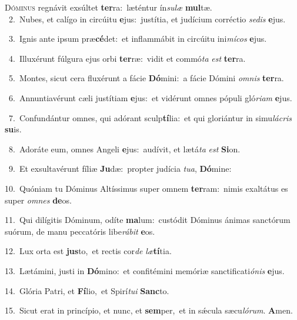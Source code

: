 \lettrine{\initial\textcolor{\initialcolor}{D}}{óminus} regnávit exsúltet \textbf{ter}\-ra:~\star læténtur ín\-\textit{su}\-\textit{læ} \textbf{mul}\-tæ.\\
{\numbfont\textcolor{\numbcolor}{~2.}}~Nubes, et calígo in circúitu \textbf{e}\-jus:~\star justítia, et judícium corréctio \textit{se}\-\textit{dis} \textbf{e}\-jus.\par
{\numbfont\textcolor{\numbcolor}{~3.}}~Ignis ante ipsum præ\-\textbf{cé}\-det:~\star et inflammábit in circúitu ini\-\textit{mí}\-\textit{cos} \textbf{e}\-jus.\par
{\numbfont\textcolor{\numbcolor}{~4.}}~Illuxérunt fúlgura ejus orbi \textbf{ter}\-ræ:~\star vidit et commó\textit{ta} \textit{est} \textbf{ter}\-ra.\par
{\numbfont\textcolor{\numbcolor}{~5.}}~Montes, sicut cera fluxérunt a fácie \textbf{Dó}\-mini:~\star a fácie Dómini \textit{om}\-\textit{nis} \textbf{ter}\-ra.\par
{\numbfont\textcolor{\numbcolor}{~6.}}~Annuntiavérunt cæli justítiam \textbf{e}\-jus:~\star et vidérunt omnes pópuli gló\-\textit{ri}\-\textit{am} \textbf{e}\-jus.\par
{\numbfont\textcolor{\numbcolor}{~7.}}~Confundántur omnes, qui adórant sculp\-\textbf{tí}\-lia:~\star et qui gloriántur in simu\-\textit{lá}\-\textit{cris} \textbf{su}\-is.\par
{\numbfont\textcolor{\numbcolor}{~8.}}~Adoráte eum, omnes Angeli \textbf{e}\-jus:~\star audívit, et lætá\textit{ta} \textit{est} \textbf{Si}\-on.\par
{\numbfont\textcolor{\numbcolor}{~9.}}~Et exsultavérunt fíliæ \textbf{Ju}\-dæ:~\star propter judícia \textit{tu}\-\textit{a}, \textbf{Dó}\-mine:\par
{\numbfont\textcolor{\numbcolor}{10.}}~Quóniam tu Dóminus Altíssimus super omnem \textbf{ter}\-ram:~\star nimis exaltátus es super \textit{om}\-\textit{nes} \textbf{de}\-os.\par
{\numbfont\textcolor{\numbcolor}{11.}}~Qui dilígitis Dóminum, odíte \textbf{ma}\-lum:~\star custódit Dóminus ánimas sanctórum suórum, de manu peccatóris libe\-\textit{rá}\-\textit{bit} \textbf{e}\-os.\par
{\numbfont\textcolor{\numbcolor}{12.}}~Lux orta est \textbf{jus}\-to,~\star et rectis cor\textit{de} \textit{læ}\-\textbf{tí}tia.\par
{\numbfont\textcolor{\numbcolor}{13.}}~Lætámini, justi in \textbf{Dó}\-mino:~\star et confitémini memóriæ sanctificati\-\textit{ó}\-\textit{nis} \textbf{e}\-jus.\par
{\numbfont\textcolor{\numbcolor}{14.}}~Glória Patri, et \textbf{Fí}\-lio,~\star et Spirí\-\textit{tu}\-\textit{i} \textbf{Sanc}\-to.\par
{\numbfont\textcolor{\numbcolor}{15.}}~Sicut erat in princípio, et nunc, et \textbf{sem}\-per,~\star et in sǽcula sæcu\-\textit{ló}\-\textit{rum}. \textbf{A}\-men.\par
